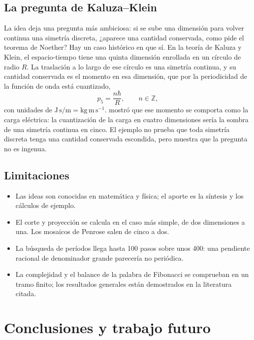 \documentclass[11pt,a4paper]{article}
\begin{document}
\subsection{La pregunta de Kaluza--Klein}

La idea deja una pregunta más ambiciosa: si se sube una dimensión para volver continua una simetría discreta, ¿aparece una cantidad conservada, como pide el teorema de Noether? Hay un caso histórico en que sí. En la teoría de Kaluza y Klein, el espacio-tiempo tiene una quinta dimensión enrollada en un círculo de radio $R$. La traslación a lo largo de ese círculo es una simetría continua, y su cantidad conservada es el momento en esa dimensión, que por la periodicidad de la función de onda está cuantizado,
\begin{equation}\label{eq:kk}
p_5 = \frac{n\hbar}{R}, \qquad n \in \mathbb Z ,
\end{equation}
con unidades de $\mathrm{J\,s/m} = \mathrm{kg\,m\,s^{-1}}$. \textcite{klein1926} mostró que ese momento se comporta como la carga eléctrica: la cuantización de la carga en cuatro dimensiones sería la sombra de una simetría continua en cinco. El ejemplo no prueba que toda simetría discreta tenga una cantidad conservada escondida, pero muestra que la pregunta no es ingenua.

\subsection{Limitaciones}

\begin{itemize}
\item Las ideas son conocidas en matemática y física; el aporte es la síntesis y los cálculos de ejemplo.
\item El corte y proyección se calcula en el caso más simple, de dos dimensiones a una. Los mosaicos de Penrose salen de cinco a dos.
\item La búsqueda de períodos llega hasta 100 pasos sobre unos 400: una pendiente racional de denominador grande parecería no periódica.
\item La complejidad y el balance de la palabra de Fibonacci se comprueban en un tramo finito; los resultados generales están demostrados en la literatura citada.
\end{itemize}

\section{Conclusiones y trabajo futuro}\label{sec:conclusiones}
\end{document}
